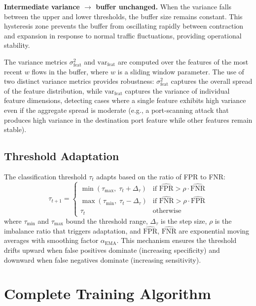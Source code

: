 \documentclass[12pt, letterpaper, oneside]{report}
\begin{document}
\textbf{Intermediate variance $\rightarrow$ buffer unchanged.} When the variance falls between the upper and lower thresholds, the buffer size remains constant. This hysteresis zone prevents the buffer from oscillating rapidly between contraction and expansion in response to normal traffic fluctuations, providing operational stability.

The variance metrics $\sigma^2_{\text{feat}}$ and $\text{var}_{\text{feat}}$ are computed over the features of the most recent $w$ flows in the buffer, where $w$ is a sliding window parameter. The use of two distinct variance metrics provides robustness: $\sigma^2_{\text{feat}}$ captures the overall spread of the feature distribution, while $\text{var}_{\text{feat}}$ captures the variance of individual feature dimensions, detecting cases where a single feature exhibits high variance even if the aggregate spread is moderate (e.g., a port-scanning attack that produces high variance in the destination port feature while other features remain stable).

\subsection{Threshold Adaptation}

The classification threshold $\tau_t$ adapts based on the ratio of FPR to FNR:
\begin{equation}
\label{eq:threshold_adapt}
\tau_{t+1} = \begin{cases}
\min(\tau_{\max}, \; \tau_t + \Delta_\tau) & \text{if } \widehat{\text{FPR}} > \rho \cdot \widehat{\text{FNR}} \\
\max(\tau_{\min}, \; \tau_t - \Delta_\tau) & \text{if } \widehat{\text{FNR}} > \rho \cdot \widehat{\text{FPR}} \\
\tau_t & \text{otherwise}
\end{cases}
\end{equation}
where $\tau_{\min}$ and $\tau_{\max}$ bound the threshold range, $\Delta_\tau$ is the step size, $\rho$ is the imbalance ratio that triggers adaptation, and $\widehat{\text{FPR}}$, $\widehat{\text{FNR}}$ are exponential moving averages with smoothing factor $\alpha_{\text{EMA}}$. This mechanism ensures the threshold drifts upward when false positives dominate (increasing specificity) and downward when false negatives dominate (increasing sensitivity).


\section{Complete Training Algorithm}
\label{sec:training_algo}
\end{document}
